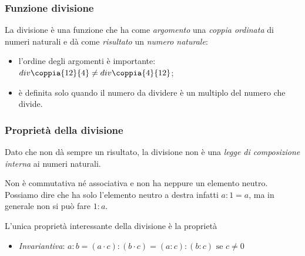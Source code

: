 \subsubsection{Funzione divisione}

La divisione è una funzione che ha come \emph{argomento} una \emph{coppia 
ordinata} di numeri naturali e dà come \emph{risultato} un \emph{numero 
naturale}:

\vspace{.5em}

\begin{osservazioni}{}{}
\begin{itemize} [nosep]
\item l'ordine degli argomenti è importante: 
\(div \coppia{12}{4} \neq div \coppia{4}{12}\);
\item è definita solo quando il numero da dividere è 
un multiplo del numero che divide.
\end{itemize}
\end{osservazioni}

\subsubsection{Proprietà della divisione}

Dato che non dà sempre un risultato, la divisione non è una 
\emph{legge di composizione interna} ai numeri naturali. 

Non è commutativa né associativa e non ha neppure un elemento neutro.
Possiamo dire che ha solo l'elemento neutro a destra infatti \(a : 1 = a\), 
ma in generale non si può fare \(1 : a\).

L'unica proprietà interessante della divisione è la proprietà
\begin{itemize} [noitemsep]
 \item \emph{Invariantiva}: 
  \(a : b = (a \cdot c) : (b \cdot c) = (a : c) : (b : c) \text{ se } c \neq 
0\)
\end{itemize}

